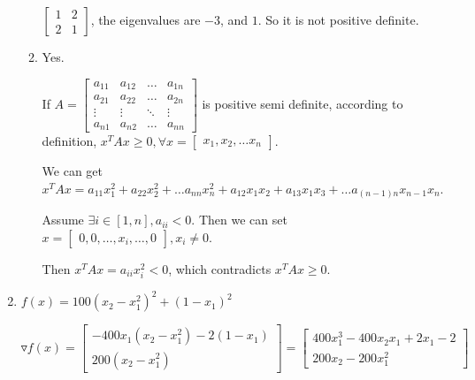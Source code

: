 \documentclass[12pt]{article}
\begin{document}
\begin{enumerate}
\begin{enumerate}
$\begin{bmatrix} 1 & 2 \\ 2 & 1\end{bmatrix}$, the eigenvalues are $-3$, and $1$. So it is not positive definite.


\item

Yes.

If $A=\begin{bmatrix} a_{11} & a_{12} & \hdots & a_{1n} \\ a_{21} & a_{22} & \hdots & a_{2n} \\  \vdots & \vdots & \ddots & \vdots \\ a_{n1} & a_{n2} & \hdots & a_{nn}\end{bmatrix}$ is positive semi definite, according to definition, $ x^T A x \ge 0, \forall x=\begin{bmatrix} x_1, x_2, \hdots x_n\end{bmatrix}$.

We can get $ x^T A x = a_{11} x_1^2 + a_{22} x_2^2 + \hdots a_{nn} x_n^2 + a_{12} x_1 x_2 + a_{13} x_1 x_3 + \hdots a_{(n-1) n}x_{n-1}x_n$.

Assume $\exists i \in [1, n], a_{ii} < 0$. Then we can set $x = \begin{bmatrix} 0, 0, \hdots, x_i, \hdots, 0 \end{bmatrix}, x_i \ne 0$.

Then $x^T A x = a_{ii} x_i^2 < 0$, which contradicts $x^T A x \ge 0$.

\end{enumerate}















\bigskip
\item

$f(x) = 100(x_2 - x_1^2)^2 + (1 - x_1)^2$

$\triangledown f(x) = \begin{bmatrix} -400 x_1 (x_2 - x_1^2) - 2(1-x_1) \\ 200 (x_2 - x_1^2)\end{bmatrix} = \begin{bmatrix} 400 x_1^3 - 400 x_2 x_1 + 2 x_1 - 2 \\ 200 x_2 - 200 x_1 ^ 2 \end{bmatrix}$


\end{enumerate}
\end{document}
